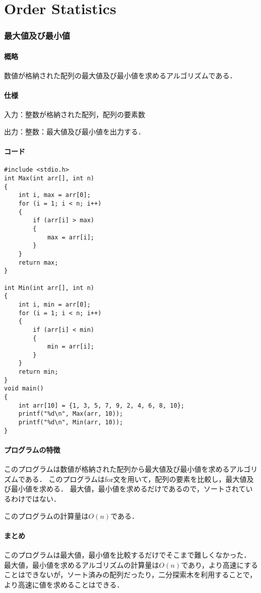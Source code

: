 \documentclass{ltjsarticle}
\begin{document}
\part{Order Statistics}
\section{最大値及び最小値}
\subsection{概略}
数値が格納された配列の最大値及び最小値を求めるアルゴリズムである．
\subsection{仕様}
\noindent 入力：整数が格納された配列，配列の要素数

\noindent 出力：整数：最大値及び最小値を出力する．
\subsection{コード}

\begin{lstlisting}[frame=single, lineskip=-5pt]
#include <stdio.h>
int Max(int arr[], int n)
{
    int i, max = arr[0];
    for (i = 1; i < n; i++)
    {
        if (arr[i] > max)
        {
            max = arr[i];
        }
    }
    return max;
}

int Min(int arr[], int n)
{
    int i, min = arr[0];
    for (i = 1; i < n; i++)
    {
        if (arr[i] < min)
        {
            min = arr[i];
        }
    }
    return min;
}
void main()
{
    int arr[10] = {1, 3, 5, 7, 9, 2, 4, 6, 8, 10};
    printf("%d\n", Max(arr, 10));
    printf("%d\n", Min(arr, 10));
}
\end{lstlisting}

\subsection{プログラムの特徴}
このプログラムは数値が格納された配列から最大値及び最小値を求めるアルゴリズムである．
このプログラムはfor文を用いて，配列の要素を比較し，最大値及び最小値を求める．
最大値，最小値を求めるだけであるので，ソートされているわけではない．

このプログラムの計算量は$O(n)$である．

\subsection{まとめ}
このプログラムは最大値，最小値を比較するだけでそこまで難しくなかった．
最大値，最小値を求めるアルゴリズムの計算量は$O(n)$であり，より高速にすることはできないが，ソート済みの配列だったり，二分探索木を利用することで，より高速に値を求めることはできる．
\end{document}
